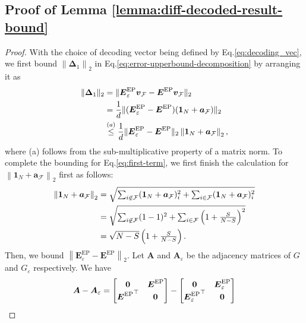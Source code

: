 \documentclass[lettersize,journal]{IEEEtran}
\newcommand{\adj}{\a}
\renewcommand{\v}{\boldsymbol{v}}
\newcommand{\norm}[1]{\left\lVert#1\right\rVert}
\newcommand{\ones}[1]{\boldsymbol{1}_{#1}}
\newcommand{\F}{\mathcal{F}}
\newcommand{\allzeros}[1]{\boldsymbol{0}_{#1}}
\newcommand{\GEP}{\boldsymbol{E}^{\mathrm{EP}}}
\renewcommand{\a}{\boldsymbol{a}}
\renewcommand{\adj}{\boldsymbol{A}}
\begin{document}
{\subsection{Proof of Lemma \ref{lemma:diff-decoded-result-bound}}
\label{sec:proof-of-lemma-diff-decoded-result-bound}
\begin{proof}
\label{proof of lemma:diff-decoded-result-bound}
    With the choice of decoding vector being defined by Eq.\eqref{eq:decoding_vec}, we first bound $\norm{\boldsymbol{\Delta}_1}_2$ in Eq.\eqref{eq:error-upperbound-decomposition} by arranging it as
    \begin{align}
    \|\boldsymbol{\Delta}_1\|_2 &=\|\GEP_{\varepsilon}\v_\F-\GEP\v_\F \|_2\notag\\ 
    &= \frac{1}{d} \|(\GEP_{\varepsilon} - \GEP)(\ones{N}+\a_\F)\|_2\notag\\
    \label{eq:first-term}
    &\overset{(a)}{\leq} \frac{1}{d}\|\GEP_{\varepsilon} - \GEP\|_2 \norm{\ones{N} + \a_\F}_2,
\end{align}
where (a) follows from the sub-multiplicative property of a matrix norm.
To complete the bounding for Eq.\eqref{eq:first-term}, we first finish the calculation for $\norm{\ones{N} + \a_\F}_2$ first as follows:
\begin{align}
    \norm{\ones{N} + \a_\F}_2 &= \sqrt{\textstyle\sum_{i\not\in \F} (\ones{N} + \a_\F)_i^2 +  \sum_{i\in \F} (\ones{N} + \a_\F)_i^2}\notag\\
    &= \sqrt{\textstyle\sum_{i\not \in \F} (1-1)^2 + \sum_{i\in \F} \left(1+\frac{S}{N-S}\right)^2}\notag\\
    \label{eq:decodingvec-l2norm}
    &= \sqrt{N-S}\left(1+\tfrac{S}{N-S}\right).
\end{align}
Then, we bound $\norm{\GEP_{\varepsilon} - \GEP}_2$. Let $\adj$ and $\adj_\varepsilon$ be the adjacency matrices of $G$ and $G_\varepsilon$ respectively. We have
\begin{align*}
    \adj - \adj_\varepsilon 
    &= \begin{bmatrix}
        \allzeros{} & \GEP \notag\\
        {\GEP}^\top & \allzeros{} 
    \end{bmatrix} - \begin{bmatrix}
        \allzeros{} & \GEP_\varepsilon\\
        {\GEP_{\varepsilon}}^\top & \allzeros{}
    \end{bmatrix}     \notag\\

\end{align*}
\end{proof}}
\end{document}
